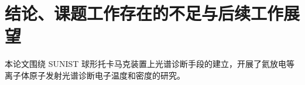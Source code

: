\graphicspath{{figures/chap05/}}

\chapter{结论、课题工作存在的不足与后续工作展望}
\label{chap:summary}

%
%
%

本论文围绕 SUNIST 球形托卡马克装置上光谱诊断手段的建立，开展了氦放电等离子体原子发射光谱诊断电子温度和密度的研究。


